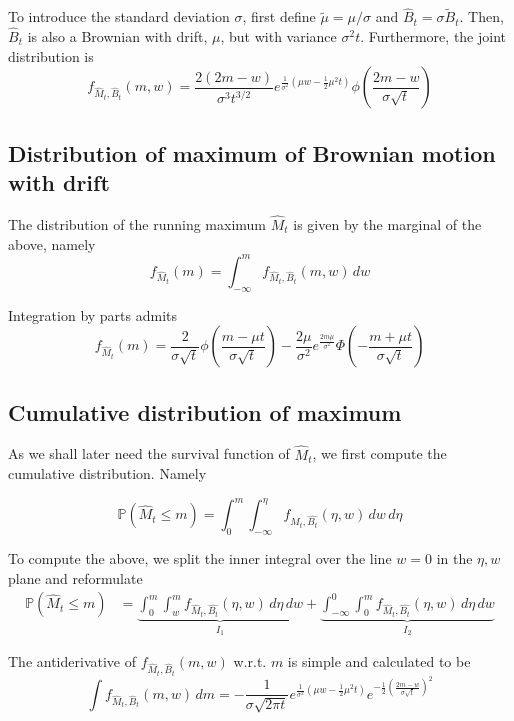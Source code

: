\documentclass[../Thesis.tex]{subfiles}
\begin{document}




To introduce the standard deviation $\sigma$, first define $\tilde{\mu} = \mu / \sigma$ and $\hat{B}_t = \sigma \tilde{B}_t$. Then, $\hat{B}_t$ is also a Brownian with drift, $\mu$, but with variance $\sigma^2 t$. Furthermore, the joint distribution is
$$f_{\hat{M}_t, \hat{B}_t}(m,w) = \frac{2(2m-w)}{\sigma^3 t^{3/2}} e^{\frac{1}{\sigma^2}\left(\mu w - \frac{1}{2}\mu^2 t\right)} \phi\left(\frac{2m-w}{\sigma \sqrt{t}}\right)$$



\subsection{Distribution of maximum of Brownian motion with drift}
The distribution of the running maximum $\hat{M}_t$ is given by the marginal of the above, namely
$$f_{\hat{M}_t} (m) = \int_{-\infty}^m f_{\hat{M}_t, \hat{B}_t} (m,w)\, dw$$

Integration by parts admits
$$ f_{\hat{M}_t} (m) = \frac{2}{\sigma \sqrt{t}} \phi \left(\frac{m-\mu t}{\sigma \sqrt{t}}\right) - \frac{2\mu}{\sigma^2} e^{\frac{2 m \mu}{\sigma^2}} \Phi\left( - \frac{m + \mu t}{\sigma \sqrt{t}} \right)$$



\subsection{Cumulative distribution of maximum}
As we shall later need the survival function of $\hat{M}_t$, we first compute the cumulative distribution. Namely

$$\mathbb{P}\left(\hat{M}_t \leq m\right) = \int_{0}^{m} \int_{-\infty}^{\eta} f_{\hat{M}_t, \hat{B_t}}(\eta,w) \, dw \, d\eta$$

To compute the above, we split the inner integral over the line $w=0$ in the $\eta, w$ plane and reformulate
\begin{align*}
    \mathbb{P}\left(\hat{M}_t \leq m\right) & = \underbrace{\int_{0}^{m} \int_{w}^{m} f_{\hat{M}_t, \hat{B_t}}(\eta,w) \, d\eta \, dw}_{I_1}  + \underbrace{\int_{-\infty}^{0} \int_{0}^{m} f_{\hat{M}_t, \hat{B_t}}(\eta,w) \, d\eta \, dw}_{I_2}
\end{align*}

The antiderivative of $f_{\hat{M}_t,\hat{B}_t}(m,w)$ w.r.t. $m$ is simple and calculated to be
$$\int f_{\hat{M}_t,\hat{B}_t}(m,w)\, dm = -\frac{1}{\sigma \sqrt{2\pi t}} e^{\frac{1}{\sigma^2} \left(\mu w - \frac{1}{2} \mu^2 t\right)} e^{-\frac{1}{2}\left(\frac{2m - w}{\sigma \sqrt{t}}\right)^2} $$
\end{document}
